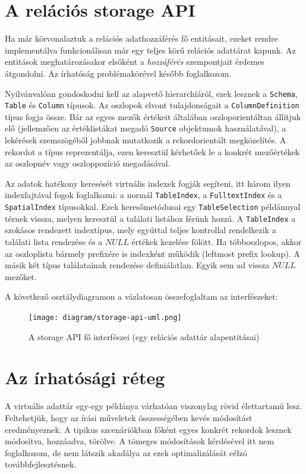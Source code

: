 \documentclass[
    parspace,
    noindent,
    nohyp,
]{elteiktdk}[2023/04/10]
\begin{document}
\section{A relációs storage API}

Ha már körvonalaztuk a relációs adathozzáférés fő entitásait,
ezeket rendre implementálva funkcionálisan már egy teljes körű relációs adattárat kapunk.
Az entitások meghatározásakor elsőként a \textit{hozzáférés} szempontjait érdemes átgondolni.
Az írhatóság problémakörével később foglalkozom.

Nyilvánvalóan gondoskodni kell az alapvető hierarchiáról,
ezek lesznek a \texttt{Schema}, \texttt{Table} és \texttt{Column} típusok.
Az oszlopok elvont tulajdonságait a \texttt{ColumnDefinition} típus fogja össze.
Bár az egyes mezők értékeit általában oszloporientáltan állítjuk elő
(jellemzően az értéklistákat megadó \texttt{Source} objektumok használatával),
a lekérések szemszögéből jobbnak mutatkozik a rekordorientált megközelítés.
A rekordot a  típus reprezentálja,
ezen keresztül kérhetőek le a konkrét mezőértékek
az oszlopnév vagy oszloppozíció megadásával.

Az adatok hatékony keresését virtuális indexek fogják segíteni,
itt három ilyen indexfajtával fogok foglalkozni:
a normál \texttt{TableIndex}, a \texttt{FulltextIndex} és a \texttt{SpatialIndex} típusokkal.
Ezek keresőmetódusai egy \texttt{TableSelection} példánnyal térnek vissza,
melyen keresztül a találati listához férünk hozzá.
A \texttt{TableIndex} a szokásos rendezett indextípus,
mely egyúttal teljes kontrollal rendelkezik a találati lista rendezése
és a $NULL$ értékek kezelése fölött.
Ha többoszlopos, akkor az oszloplista bármely prefixére is indexként működik (leftmost prefix lookup).
A másik két típus találatainak rendezése definiálatlan.
Egyik sem ad vissza $NULL$ mezőket.

A következő osztálydiagramon a vázlatosan összefoglaltam az interfészeket:

\begin{figure}[H]
\centering
\texttt{[image: diagram/storage-api-uml.png]}
\caption{A storage API fő interfészei (egy relációs adattár alapentitásai)}
\end{figure}


\section{Az írhatósági réteg}

A virtuális adattár egy-egy példánya várhatóan viszonylag rövid élettartamú lesz.
Feltehetjük, hogy az írási műveletek összességében kevés módosítást eredményeznek.
A tipikus szcenáriókban főként egyes konkrét rekordok lesznek módosítva, hozzáadva, törölve.
A tömeges módosítások kérdésével itt nem foglalkozom,
de nem látszik akadálya az ezek optimalizálását célzó továbbfejlesztésnek.
\end{document}

